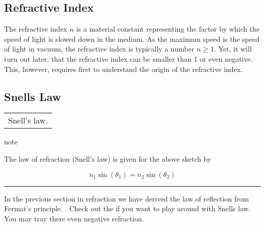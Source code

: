 \documentclass[letterpaper,10pt,english]{sphinxmanual}
\begin{document}
\subsection{Refractive Index}
\label{\detokenize{notebooks/L1/Refraction:Refractive-Index}}
The refractive index \(n\) is a material constant representing the factor by which the speed of light is slowed down in the medium. As the maximum speed is the speed of light in vacuum, the refractive index is typically a number \(n \ge 1\). Yet, it will turn out later, that the refractive index can be smaller than 1 or even negative. This, however, requires first to understand the origin of the refractive index.


\subsection{Snells Law}
\label{\detokenize{notebooks/L1/Refraction:Snells-Law}}

\begin{savenotes}\sphinxattablestart
\centering
\begin{tabulary}{\linewidth}[t]{|T|}
\hline
\sphinxstyletheadfamily 
{} 
\\
\hline
{} Snell’s law.
\\
\hline
\end{tabulary}
\par
\sphinxattableend\end{savenotes}

\begin{sphinxadmonition}{note}{}\unskip
{}

The law of refraction (Snell’s law) is given for the above sketch by

\begin{equation}
n_1 \sin(\theta_1)=n_2 \sin(\theta_2)
\end{equation}
\end{sphinxadmonition}


\bigskip\hrule\bigskip


In the previous section in refraction we have derived the law of reflection from Fermat’s principle. . Check out the  if you want to play around with Snells law. You may tray there even negative refraction.
\end{document}
